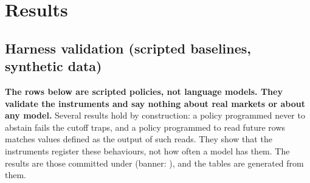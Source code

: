 \section{Results}
\label{sec:results}

\subsection{Harness validation (scripted baselines, synthetic data)}
\label{sec:harness-results}

\textbf{The rows below are scripted policies, not language models. They
validate the instruments and say nothing about real markets or about any
model.} Several results hold by construction: a policy programmed never to
abstain fails the cutoff traps, and a policy programmed to read future rows
matches values defined as the output of such reads. They show that the
instruments register these behaviours, not how often a model has them. The
results are those committed under  (banner:
\emph{\resBanner}), and the tables are generated from them.

\begin{table}[t]
\centering
\resizebox{\linewidth}{!}{}
\caption{Harness validation on \SuiteTasks{} synthetic tasks (scripted
baselines). The accuracy interval is a Wilson 95\% interval. Claim counts are
supported (grounded) or attributed to a citation (cited), out of all numeric
claims. ``ep.'' counts episodes out of \SuiteTasks{}. False abstention counts
 on the answerable tasks. The numeric hindsight match
counts answers containing a number equal to the hindsight value, out of the
tasks that have a numeric one.}
\label{tab:baselines}
\end{table}

\begin{table}[t]
\centering
\small

\caption{Correct answers by category (scripted baselines, synthetic data).}
\label{tab:categories}
\end{table}

